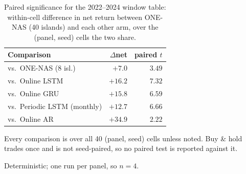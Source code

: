 \begin{table}[h]
\centering
\begin{threeparttable}
\caption{Paired significance for the 2022--2024 window table: within-cell
difference in net return between ONE-NAS (40 islands) and each other arm,
over the (panel, seed) cells the two share.}
\label{tab:paired}
\begin{tabular}{lrr}
\toprule
Comparison & $\Delta$net & paired $t$ \\
\midrule
vs.\ ONE-NAS (8 isl.)            & $+7.0$  & $3.49$ \\
vs.\ Online LSTM                 & $+16.2$ & $7.32$ \\
vs.\ Online GRU                  & $+15.8$ & $6.59$ \\
vs.\ Periodic LSTM (monthly)     & $+12.7$ & $6.66$ \\
vs.\ Online AR\tnote{a}          & $+34.9$ & $2.22$ \\
\bottomrule
\end{tabular}
\begin{tablenotes}\footnotesize
\item Every comparison is over all 40 (panel, seed) cells unless noted.
Buy \& hold trades once and is not seed-paired, so no paired test is
reported against it.
\item[a] Deterministic; one run per panel, so $n{=}4$.
\end{tablenotes}
\end{threeparttable}
\end{table}

